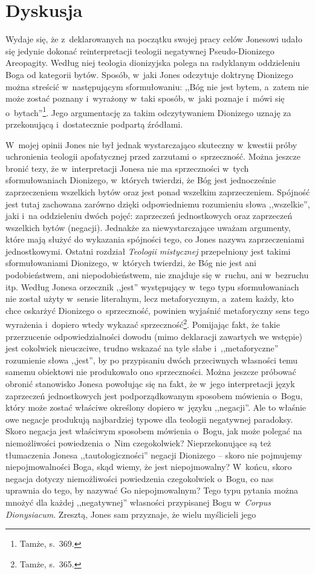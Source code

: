 \section{Dyskusja}

Wydaje się, że z~deklarowanych na początku swojej pracy celów Jonesowi udało się jedynie dokonać reinterpretacji teologii negatywnej Pseudo-Dionizego Areopagity. Według niej teologia dionizyjska polega na radyklanym oddzieleniu Boga od kategorii bytów. Sposób, w~jaki Jones odczytuje doktrynę Dionizego można streścić w~następującym sformułowaniu: ,,Bóg nie jest bytem, a~zatem nie może zostać poznany i~wyrażony w~taki sposób, w~jaki poznaje i~mówi się o~bytach''\footnote{Tamże, s.~369.}. Jego argumentację za takim odczytywaniem Dionizego uznaję za przekonującą i~dostatecznie podpartą źródłami.

W~mojej opinii Jones nie był jednak wystarczająco skuteczny w~kwestii próby uchronienia teologii apofatycznej przed zarzutami o~sprzeczność. Można jeszcze bronić tezy, że w~interpretacji Jonesa nie ma sprzeczności w~tych sformułowaniach Dionizego, w~których twierdzi, że Bóg jest jednocześnie zaprzeczeniem wszelkich bytów oraz jest ponad wszelkim zaprzeczeniem. Spójność jest tutaj zachowana zarówno dzięki odpowiedniemu rozumieniu słowa ,,wszelkie'', jaki i~na oddzieleniu dwóch pojęć: zaprzeczeń jednostkowych oraz zaprzeczeń wszelkich bytów (negacji). Jednakże za niewystarczające uważam argumenty, które mają służyć do wykazania spójności tego, co Jones nazywa zaprzeczeniami jednostkowymi. Ostatni rozdział \textit{Teologii mistycznej} przepełniony jest takimi sformułowaniami Dionizego, w~których twierdzi, że Bóg nie jest ani podobieństwem, ani niepodobieństwem, nie znajduje się w~ruchu, ani w~bezruchu itp. Według Jonesa orzecznik ,,jest'' występujący w~tego typu sformułowaniach nie został użyty w~sensie literalnym, lecz metaforycznym, a~zatem każdy, kto chce oskarżyć Dionizego o~sprzeczność, powinien wyjaśnić metaforyczny sens tego wyrażenia i~dopiero wtedy wykazać sprzeczność\footnote{Tamże, s.~365.}. Pomijając fakt, że takie przerzucenie odpowiedzialności dowodu (mimo deklaracji zawartych we wstępie) jest cokolwiek nieuczciwe, trudno wskazać na tyle słabe i~,,metaforyczne'' rozumienie słowa ,,jest'', by po przypisaniu dwóch przeciwnych własności temu samemu obiektowi nie produkowało ono sprzeczności. Można jeszcze próbować obronić stanowisko Jonesa powołując się na fakt, że w~jego interpretacji język zaprzeczeń jednostkowych jest podporządkowanym sposobem mówienia o~Bogu, który może zostać właściwe określony dopiero w~języku ,,negacji''. Ale to właśnie owe negacje produkują najbardziej typowe dla teologii negatywnej paradoksy. Skoro negacja jest właściwym sposobem mówienia o~Bogu, jak może polegać na niemożliwości powiedzenia o~Nim czegokolwiek? Nieprzekonujące są też tłumaczenia Jonesa ,,tautologiczności'' negacji Dionizego -- skoro nie pojmujemy niepojmowalności Boga, skąd wiemy, że jest niepojmowalny? W~końcu, skoro negacja dotyczy niemożliwości powiedzenia czegokolwiek o~Bogu, co nas uprawnia do tego, by nazywać Go niepojmowalnym? Tego typu pytania można mnożyć dla każdej ,,negatywnej'' własności przypisanej Bogu w~\textit{Corpus Dionysiacum}. Zresztą, Jones sam przyznaje, że wielu myślicieli jego 